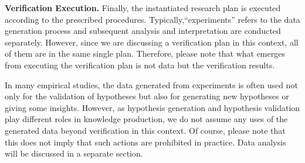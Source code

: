 \documentclass{book}
\begin{document}





\textbf{Verification Execution.} Finally, the instantiated research plan is executed according to the prescribed procedures. Typically,``experiments'' refers to the data generation process and subsequent analysis and interpretation are conducted separately. However, since we are discussing a verification plan in this context, all of them are in the same single plan. Therefore, please note that what emerges from executing the verification plan is not data but the verification results.

In many empirical studies, the data generated from experiments is often used not only for the validation of hypotheses but also for generating new hypotheses or giving some insights. However, as hypothesis generation and hypothesis validation play different roles in knowledge production, we do not assume any uses of the generated data beyond verification in this context. Of course, please note that this does not imply that such actions are prohibited in practice. Data analysis will be discussed in a separate section.
\end{document}
